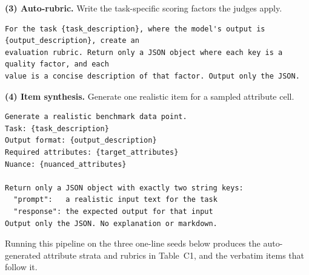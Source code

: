 \documentclass[11pt,a4paper]{article}
\begin{document}
\textbf{(3) Auto-rubric.} Write the task-specific scoring factors the judges apply.

\begin{Verbatim}[breaklines=true,breakanywhere=true,fontsize=\small]
For the task {task_description}, where the model's output is {output_description}, create an
evaluation rubric. Return only a JSON object where each key is a quality factor, and each
value is a concise description of that factor. Output only the JSON.
\end{Verbatim}


\textbf{(4) Item synthesis.} Generate one realistic item for a sampled attribute cell.

\begin{Verbatim}[breaklines=true,breakanywhere=true,fontsize=\small]
Generate a realistic benchmark data point.
Task: {task_description}
Output format: {output_description}
Required attributes: {target_attributes}
Nuance: {nuanced_attributes}

Return only a JSON object with exactly two string keys:
  "prompt":   a realistic input text for the task
  "response": the expected output for that input
Output only the JSON. No explanation or markdown.
\end{Verbatim}


Running this pipeline on the three one-line seeds below produces the auto-generated attribute strata and rubrics in
Table~C1, and the verbatim items that follow it.
\end{document}
